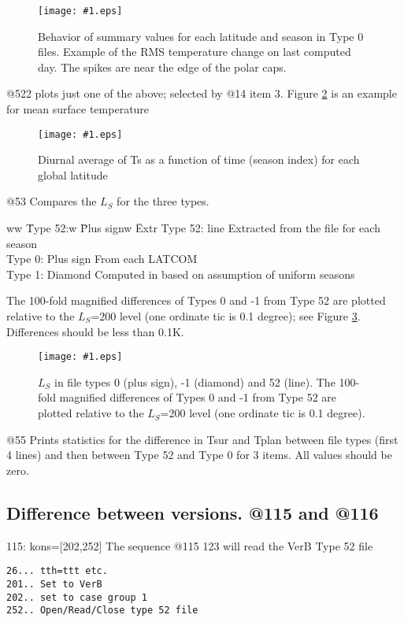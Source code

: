\documentclass{article}  %
\newcommand{\igc}[1]{\texttt{[image: \#1.eps]}}
\begin{document}
\begin{figure}[!ht] \igc{p52a}
\caption[Type 0 summary] {Behavior of summary values for each latitude and season in Type 0 files. Example of 
the RMS temperature change on last computed day. The spikes are near the edge of the polar caps. \label{p52a} } \end{figure}

@522 plots just one of the above; selected by  @14 item 3. Figure \ref{p522} is an example for mean surface temperature

\begin{figure}[!ht] \igc{p522}
\caption[Diurnal Mean Ts] {Diurnal average of Ts as a function of time (season index) for each global latitude 
\label{p522} } \end{figure}

@53 Compares the $L_S$ for the three types. 
 \vspace{-5.mm} \begin{tabbing}
ww \= Type 52:w \= Plus signw \= Extr \kill
 \> Type 52: \> line \>    Extracted from the file for each season \\
 \> Type 0: \>  Plus sign\>  From each LATCOM \\
 \> Type 1:  \> Diamond \>  Computed in  based on assumption of uniform seasons \\ 
\end{tabbing}
 The 100-fold magnified differences of Types 0 and -1 from Type 52  are plotted relative to the $L_S$=200 level (one ordinate tic is 0.1 degree); see Figure \ref{p53}. Differences should be less than 0.1K.

\begin{figure}[!ht] \igc{p53}
\caption[Diurnal Mean Ts] {$L_S$ in file types 0 (plus sign), -1 (diamond) and 52 (line).  The 100-fold magnified differences of Types 0 and -1 from Type 52  are plotted relative to the $L_S$=200 level (one ordinate tic is 0.1 degree).
\label{p53} } \end{figure}


@55 Prints statistics for the difference in Tsur and Tplan between file types (first 4 lines) and then between Type 52 and Type 0 for 3 items. All values should be zero.

\subsection{Difference between versions. @115 and @116} %
115: kons=[202,252]   The sequence @115 123 will read the VerB Type 52 file
\vspace{-3.mm} 
\begin{verbatim}
26... tth=ttt etc.
201.. Set to VerB
202.. set to case group 1
252.. Open/Read/Close type 52 file
\end{verbatim}
\end{document}
